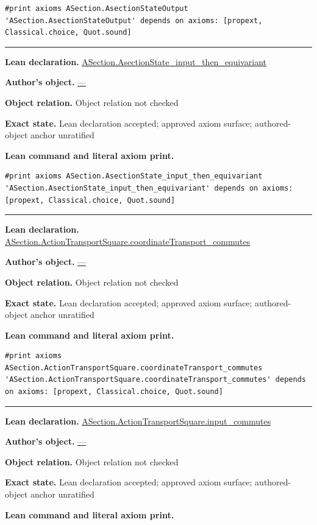 \documentclass[11pt]{article}
\theoremstyle{plain}
\theoremstyle{definition}
\theoremstyle{remark}
\begin{document}
\begin{tcolorbox}
\begin{Verbatim}[breaklines=true,breakanywhere=true,fontsize=\small]
#print axioms ASection.AsectionStateOutput
'ASection.AsectionStateOutput' depends on axioms: [propext, Classical.choice, Quot.sound]
\end{Verbatim}
\medskip\hrule\medskip
\textbf{Lean declaration.} \url{ASection.AsectionState_input_then_equivariant}
\par\textbf{Author's object.} \url{—}
\par\textbf{Object relation.} Object relation not checked
\par\textbf{Exact state.} Lean declaration accepted; approved axiom surface; authored-object anchor unratified
\par\smallskip\textbf{Lean command and literal axiom print.}
\begin{Verbatim}[breaklines=true,breakanywhere=true,fontsize=\small]
#print axioms ASection.AsectionState_input_then_equivariant
'ASection.AsectionState_input_then_equivariant' depends on axioms: [propext, Classical.choice, Quot.sound]
\end{Verbatim}
\medskip\hrule\medskip
\textbf{Lean declaration.} \url{ASection.ActionTransportSquare.coordinateTransport_commutes}
\par\textbf{Author's object.} \url{—}
\par\textbf{Object relation.} Object relation not checked
\par\textbf{Exact state.} Lean declaration accepted; approved axiom surface; authored-object anchor unratified
\par\smallskip\textbf{Lean command and literal axiom print.}
\begin{Verbatim}[breaklines=true,breakanywhere=true,fontsize=\small]
#print axioms ASection.ActionTransportSquare.coordinateTransport_commutes
'ASection.ActionTransportSquare.coordinateTransport_commutes' depends on axioms: [propext, Classical.choice, Quot.sound]
\end{Verbatim}
\medskip\hrule\medskip
\textbf{Lean declaration.} \url{ASection.ActionTransportSquare.input_commutes}
\par\textbf{Author's object.} \url{—}
\par\textbf{Object relation.} Object relation not checked
\par\textbf{Exact state.} Lean declaration accepted; approved axiom surface; authored-object anchor unratified
\par\smallskip\textbf{Lean command and literal axiom print.}
\begin{Verbatim}[breaklines=true,breakanywhere=true,fontsize=\small]

\end{Verbatim}
\end{tcolorbox}
\end{document}
